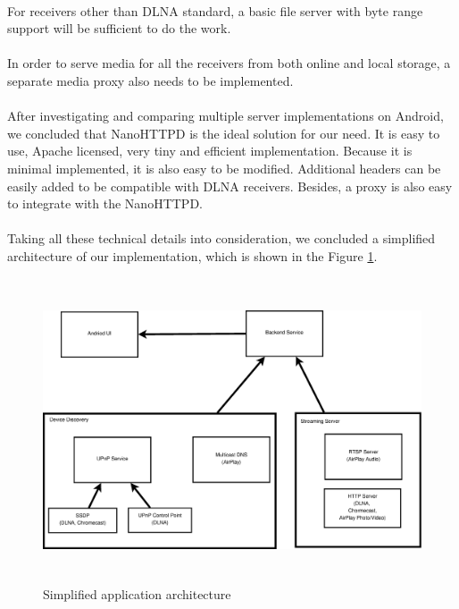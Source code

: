 \\
For receivers other than DLNA standard, a basic file server with byte range support will be sufficient to do the work.\\
\\
In order to serve media for all the receivers from both online and local storage, a separate media proxy also needs to be implemented.\\
\\
After investigating and comparing multiple server implementations on Android, we
concluded that NanoHTTPD is the ideal solution for our need. It is easy to use,
Apache licensed, very tiny and efficient implementation. Because it is minimal implemented, it is also easy to be modified. Additional headers can be easily added to be compatible with DLNA receivers. Besides, a proxy is also easy to integrate with the NanoHTTPD.\\
\\
Taking all these technical details into consideration, we concluded a simplified
architecture of our implementation, which is shown in the Figure \ref{chart3}.
\begin{figure}[htb]
\centering \includegraphics[height=9cm]{charts/chart3}
\caption{Simplified application architecture\label{chart3}}
\end{figure}

